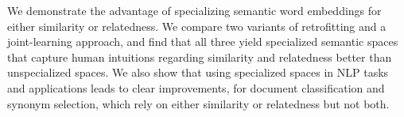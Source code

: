 We demonstrate the advantage of specializing semantic word embeddings for either similarity or relatedness. We compare two variants of retrofitting and a joint-learning approach, and find that all three yield specialized semantic spaces that capture human intuitions regarding similarity and relatedness better than unspecialized spaces. We also show that using specialized spaces in NLP tasks and applications leads to clear improvements, for document classification and synonym selection, which rely on either similarity or relatedness but not both.
